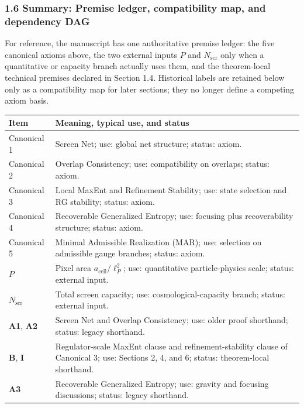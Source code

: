 \subsubsection{1.6 Summary: Premise ledger, compatibility map, and dependency DAG}\label{16-summary-complete-axiom-set}

For reference, the manuscript has one authoritative premise ledger: the five canonical axioms above, the two external inputs \(P\) and \(N_{\mathrm{scr}}\) only when a quantitative or capacity branch actually uses them, and the theorem-local technical premises declared in Section 1.4. Historical labels are retained below only as a compatibility map for later sections; they no longer define a competing axiom basis.

{\def\LTcaptype{none}
\scriptsize
\setlength{\tabcolsep}{2pt}
\begin{longtable}{@{}>{\RaggedRight\arraybackslash}p{}>{\RaggedRight\arraybackslash}p{}@{}}
\toprule\noalign{}
Item & Meaning, typical use, and status \\
\midrule\noalign{}
\endhead
\bottomrule\noalign{}
\endlastfoot
Canonical 1 & Screen Net; use: global net structure; status: axiom. \\
Canonical 2 & Overlap Consistency; use: compatibility on overlaps; status: axiom. \\
Canonical 3 & Local MaxEnt and Refinement Stability; use: state selection and RG stability; status: axiom. \\
Canonical 4 & Recoverable Generalized Entropy; use: focusing plus recoverability structure; status: axiom. \\
Canonical 5 & Minimal Admissible Realization (MAR); use: selection on admissible gauge branches; status: axiom. \\
\(P\) & Pixel area \(a_{\mathrm{cell}}/\ell_P^2\); use: quantitative particle-physics scale; status: external input. \\
\(N_{\mathrm{scr}}\) & Total screen capacity; use: cosmological-capacity branch; status: external input. \\
\textbf{A1}, \textbf{A2} & Screen Net and Overlap Consistency; use: older proof shorthand; status: legacy shorthand. \\
\textbf{B}, \textbf{I} & Regulator-scale MaxEnt clause and refinement-stability clause of Canonical 3; use: Sections 2, 4, and 6; status: theorem-local shorthand. \\
\textbf{A3} & Recoverable Generalized Entropy; use: gravity and focusing discussions; status: legacy shorthand. \\

\end{longtable}}
